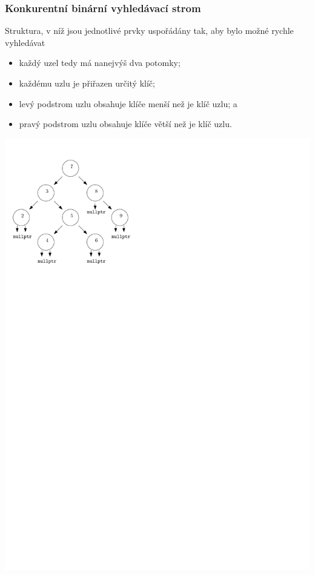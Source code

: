 \documentclass[usenames,dvipsnames,9pt]{beamer}
\begin{document}
\begin{frame}[fragile]
  \frametitle{Konkurentní binární vyhledávací strom}
  
    \begin{minipage}{0.6\linewidth}
    Struktura, v níž jsou jednotlivé prvky uspořádány tak, aby bylo možné rychle vyhledávat
    \vspace{2em}
    \begin{itemize}
    \item každý uzel tedy má nanejvýš dva potomky;
    \item každému uzlu je přiřazen určitý klíč;
    \item levý podstrom uzlu obsahuje klíče menší než je klíč uzlu; a
    \item pravý podstrom uzlu obsahuje klíče větší než je klíč uzlu.
    \end{itemize}
  \end{minipage}
  \hfill
  \begin{minipage}{0.3\linewidth}
    \includegraphics[width=1.3\linewidth]{figs/bst.pdf}
  \end{minipage}
\end{frame}
\end{document}
